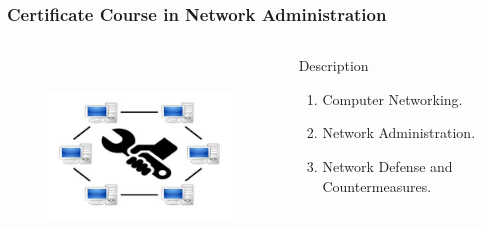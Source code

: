 \begin{frame}
	\frametitle{Certificate Course in Network Administration}
		\begin{columns}
		
		
		\begin{figure}
			\includegraphics[width=180pt,height=150pt]{figures/course_na.jpg}
		\end{figure}
		
		
		\begin{block}{Description}
			
			\begin{enumerate}
				\item Computer Networking. 
				\item Network Administration.
				\item Network Defense and Countermeasures.
			\end{enumerate}
			
		\end{block}
		
	\end{columns}
\end{frame}

